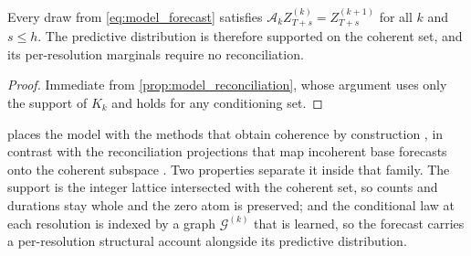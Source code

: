 \begin{corollary}
\label{cor:model_coherent_forecast}
Every draw from \cref{eq:model_forecast} satisfies
\(\mathcal A_kZ^{(k)}_{T+s}=Z^{(k+1)}_{T+s}\) for all \(k\) and
\(s\leq h\). The predictive distribution is therefore supported on the coherent
set, and its per-resolution marginals require no reconciliation.
\end{corollary}

\begin{proof}
Immediate from \cref{prop:model_reconciliation}, whose argument uses only the
support of \(K_k\) and holds for any conditioning set.
\end{proof}

 places the model with the methods that
obtain coherence by construction \citep{pennings2017integrated,
rangapuram2021hiere2e,das_topdown2023}, in contrast with the reconciliation
projections that map incoherent base forecasts onto the coherent subspace
\citep{hyndman2011optimal,wickramasuriya2019mint}. Two properties separate it
inside that family. The support is the integer lattice intersected with the
coherent set, so counts and durations stay whole and the zero atom is
preserved; and the conditional law at each resolution is indexed by a graph
\(\mathcal G^{(k)}\) that is learned, so the forecast carries a per-resolution
structural account alongside its predictive distribution.

